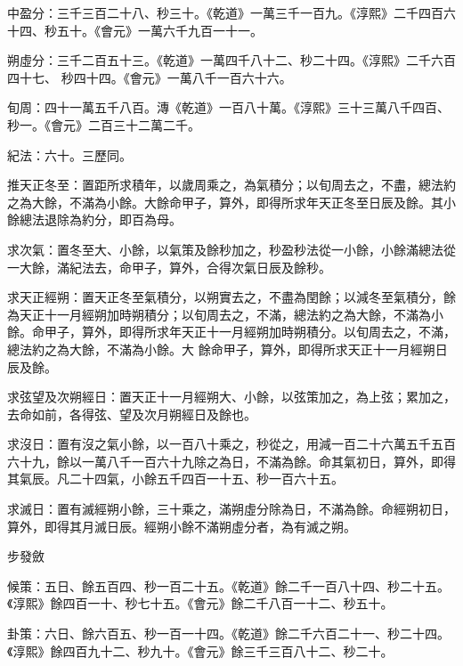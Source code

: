 \begin{pinyinscope}
 中盈分：三千三百二十八、秒三十。《乾道》一萬三千一百九。《淳熙》二千四百六十四、秒五十。《會元》一萬六千九百一十一。



 朔虛分：三千二百五十三。《乾道》一萬四千八十二、秒二十四。《淳熙》二千六百四十七、
 秒四十四。《會元》一萬八千一百六十六。



 旬周：四十一萬五千八百。漙《乾道》一百八十萬。《淳熙》三十三萬八千四百、秒一。《會元》二百三十二萬二千。



 紀法：六十。三歷同。



 推天正冬至：置距所求積年，以歲周乘之，為氣積分；以旬周去之，不盡，總法約之為大餘，不滿為小餘。大餘命甲子，算外，即得所求年天正冬至日辰及餘。其小餘總法退除為約分，即百為母。



 求次氣：置冬至大、小餘，以氣策及餘秒加之，秒盈秒法從一小餘，小餘滿總法從一大餘，滿紀法去，命甲子，算外，合得次氣日辰及餘秒。



 求天正經朔：置天正冬至氣積分，以朔實去之，不盡為閏餘；以減冬至氣積分，餘為天正十一月經朔加時朔積分；以旬周去之，不滿，總法約之為大餘，不滿為小餘。命甲子，算外，即得所求年天正十一月經朔加時朔積分。以旬周去之，不滿，總法約之為大餘，不滿為小餘。大
 餘命甲子，算外，即得所求天正十一月經朔日辰及餘。



 求弦望及次朔經日：置天正十一月經朔大、小餘，以弦策加之，為上弦；累加之，去命如前，各得弦、望及次月朔經日及餘也。



 求沒日：置有沒之氣小餘，以一百八十乘之，秒從之，用減一百二十六萬五千五百六十九，餘以一萬八千一百六十九除之為日，不滿為餘。命其氣初日，算外，即得其氣辰。凡二十四氣，小餘五千四百一十五、秒一百六十五。



 求滅日：置有滅經朔小餘，三十乘之，滿朔虛分除為日，不滿為餘。命經朔初日，算外，即得其月滅日辰。經朔小餘不滿朔虛分者，為有滅之朔。



 步發斂



 候策：五日、餘五百四、秒一百二十五。《乾道》餘二千一百八十四、秒二十五。《淳熙》餘四百一十、秒七十五。《會元》餘二千八百一十二、秒五十。



 卦策：六日、餘六百五、秒一百一十四。《乾道》餘二千六百二十一、秒二十四。《淳熙》餘四百九十二、秒九十。《會元》餘三千三百八十二、秒二十。




\end{pinyinscope}
